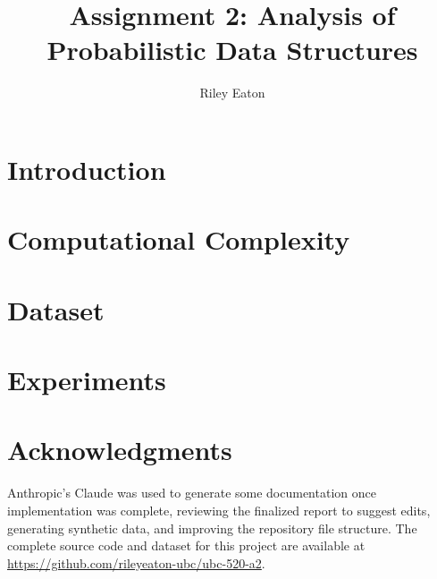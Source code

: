 \documentclass[acmsmall,screen,nonacm]{acmart}
\title{Assignment 2: Analysis of Probabilistic Data Structures}
\author{Riley Eaton}
\affiliation{%
  \institution{University of British Columbia}
  \city{Kelowna}
  \state{BC}
  \country{Canada}
}
\begin{document}
\maketitle

\section{Introduction} \label{sec:introduction}


\section{Computational Complexity} \label{sec:complexity}


\section{Dataset} \label{sec:dataset}


\section{Experiments} \label{sec:experiments}







\section*{Acknowledgments}
Anthropic's Claude was used to generate some documentation once implementation was complete, reviewing the finalized report to suggest edits, generating synthetic data, and improving the repository file structure. The complete source code and dataset for this project are available at \url{https://github.com/rileyeaton-ubc/ubc-520-a2}.
\end{document}
